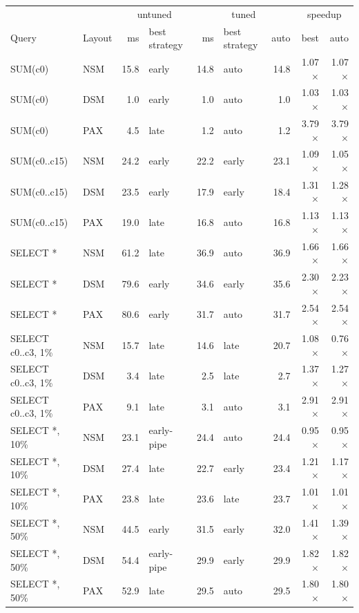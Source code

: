\begin{tabular}{llrlrlrrr}
\toprule
& & \multicolumn{2}{c}{untuned} & \multicolumn{3}{c}{tuned} & \multicolumn{2}{c}{speedup} \\
Query & Layout & ms & best strategy & ms & best strategy & auto & best & auto \\
\midrule
SUM(c0) & NSM & 15.8 & early & 14.8 & auto & 14.8 & 1.07$\times$ & 1.07$\times$ \\
SUM(c0) & DSM & 1.0 & early & 1.0 & auto & 1.0 & 1.03$\times$ & 1.03$\times$ \\
SUM(c0) & PAX & 4.5 & late & 1.2 & auto & 1.2 & 3.79$\times$ & 3.79$\times$ \\
SUM(c0..c15) & NSM & 24.2 & early & 22.2 & early & 23.1 & 1.09$\times$ & 1.05$\times$ \\
SUM(c0..c15) & DSM & 23.5 & early & 17.9 & early & 18.4 & 1.31$\times$ & 1.28$\times$ \\
SUM(c0..c15) & PAX & 19.0 & late & 16.8 & auto & 16.8 & 1.13$\times$ & 1.13$\times$ \\
SELECT * & NSM & 61.2 & late & 36.9 & auto & 36.9 & 1.66$\times$ & 1.66$\times$ \\
SELECT * & DSM & 79.6 & early & 34.6 & early & 35.6 & 2.30$\times$ & 2.23$\times$ \\
SELECT * & PAX & 80.6 & early & 31.7 & auto & 31.7 & 2.54$\times$ & 2.54$\times$ \\
SELECT c0..c3, 1\% & NSM & 15.7 & late & 14.6 & late & 20.7 & 1.08$\times$ & 0.76$\times$ \\
SELECT c0..c3, 1\% & DSM & 3.4 & late & 2.5 & late & 2.7 & 1.37$\times$ & 1.27$\times$ \\
SELECT c0..c3, 1\% & PAX & 9.1 & late & 3.1 & auto & 3.1 & 2.91$\times$ & 2.91$\times$ \\
SELECT *, 10\% & NSM & 23.1 & early-pipe & 24.4 & auto & 24.4 & 0.95$\times$ & 0.95$\times$ \\
SELECT *, 10\% & DSM & 27.4 & late & 22.7 & early & 23.4 & 1.21$\times$ & 1.17$\times$ \\
SELECT *, 10\% & PAX & 23.8 & late & 23.6 & late & 23.7 & 1.01$\times$ & 1.01$\times$ \\
SELECT *, 50\% & NSM & 44.5 & early & 31.5 & early & 32.0 & 1.41$\times$ & 1.39$\times$ \\
SELECT *, 50\% & DSM & 54.4 & early-pipe & 29.9 & early & 29.9 & 1.82$\times$ & 1.82$\times$ \\
SELECT *, 50\% & PAX & 52.9 & late & 29.5 & auto & 29.5 & 1.80$\times$ & 1.80$\times$ \\
\bottomrule
\end{tabular}

